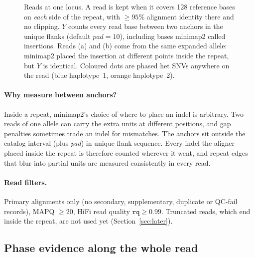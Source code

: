 \documentclass[10pt,a4paper]{article}
\begin{document}
\begin{figure}[H]
\caption{Reads at one locus. A read is kept when it covers 128 reference bases on \emph{each} side of the repeat,
with $\geq95\%$ alignment identity there and no clipping. $Y$ counts every read base between two anchors in the
unique flanks (default $\textit{pad}=10$), including bases minimap2 called insertions. Reads (a) and (b) come from
the same expanded allele: minimap2 placed the insertion at different points inside the repeat, but $Y$ is identical.
Coloured dots are phased het SNVs anywhere on the read (blue haplotype~1, orange haplotype~2).}
\label{fig:reads}
\end{figure}

\paragraph{Why measure between anchors?} Inside a repeat, minimap2's choice of where to place an indel is
arbitrary. Two reads of one allele can carry the extra units at different positions, and gap penalties sometimes
trade an indel for mismatches. The anchors sit outside the catalog interval (plus \textit{pad}) in unique flank
sequence. Every indel the aligner placed inside the repeat is therefore counted wherever it went, and repeat edges
that blur into partial units are measured consistently in every read.

\paragraph{Read filters.} Primary alignments only (no secondary, supplementary, duplicate or QC-fail records),
MAPQ $\geq20$, HiFi read quality $\texttt{rq}\geq0.99$. Truncated reads, which end inside the repeat, are not used
yet (Section~\ref{sec:later}).

\subsection{Phase evidence along the whole read}
\end{document}
